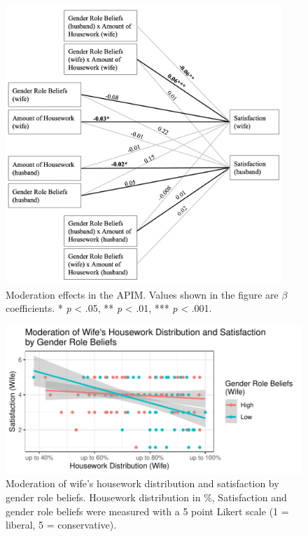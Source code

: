 \documentclass[
  man,floatsintext]{apa6}
\begin{document}
\begin{figure}
\includegraphics[width=4.11in]{moderation} \caption{Moderation effects in the APIM. Values shown in the figure are \(\beta\) coefficients.
* \emph{p} \textless{} .05, ** \emph{p} \textless{} .01, *** \emph{p} \textless{} .001.}\label{fig:unnamed-chunk-9}
\end{figure}



\begin{figure}
\centering
\includegraphics{results_files/figure-latex/unnamed-chunk-12-1.pdf}
\caption{\label{fig:unnamed-chunk-12}Moderation of wife's housework distribution and satisfaction by gender role beliefs. Housework distribution in \%, Satisfaction and gender role beliefs were measured with a 5 point Likert scale (1 = liberal, 5 = conservative).}
\end{figure}
\end{document}
